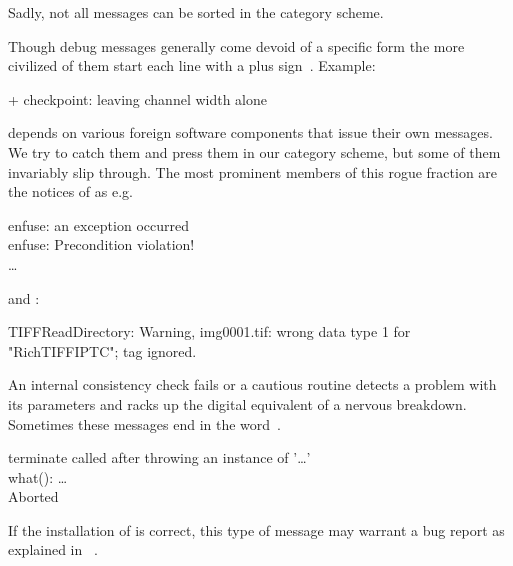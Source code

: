 \noindent Sadly, not all messages can be sorted in the category scheme.

\begin{description}
\item[Debug Messages:] Though debug messages generally come devoid of a specific form the more
  civilized of them start each line with a plus sign~\sample{+}.  Example:

  \begin{literal}
    + checkpoint: leaving channel width alone
  \end{literal}

\item[Foreign Sources:] \appcmd{} depends on various foreign software components that issue
  their own messages.  We try to catch them and press them in our category scheme, but some of
  them invariably slip through.  The most prominent members of this rogue fraction are the
  notices of  as e.g.

  \begin{literal}
    enfuse: an exception occurred \\
    enfuse: Precondition violation! \\
    \dots
  \end{literal}

  and :

  \begin{literal}
    TIFFReadDirectory: Warning, img0001.tif: wrong data type 1 for "RichTIFFIPTC"; tag ignored.
  \end{literal}

\item[``Should-Never-Happen'':] An internal consistency check fails or a cautious routine
  detects a problem with its parameters and racks up the digital equivalent of a nervous
  breakdown.  Sometimes these messages end in the word~.

  \begin{literal}
    terminate called after throwing an instance of '\dots' \\
    what(): \dots \\
    Aborted
  \end{literal}

  If the installation of \appcmd{} is correct, this type of message may warrant a bug report as
  explained in \appendixName~.
\end{description}

